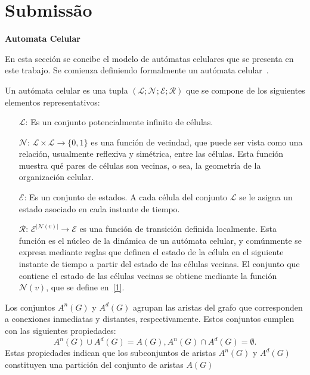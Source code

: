 \documentclass[a4paper,11pt]{article}
\begin{document}
{\section*{Submissão}

\textbf{Automata Celular}

En esta secci\'on se concibe el modelo de aut\'omatas celulares que se presenta en este trabajo. Se comienza definiendo formalmente un aut\'omata celular~\cite{5}.

Un aut\'omata celular es una tupla $(\mathcal{L}; \mathcal{N}; \mathcal{E}; \mathcal{R})$ que se compone de los siguientes elementos representativos:
\begin{itemize}
\item [$\mathcal{L}$:] Es un conjunto potencialmente infinito de c\'elulas.
\item [$\mathcal{N}$:] $\mathcal{L} \times \mathcal{L} \rightarrow \lbrace 0,1 \rbrace$ es una funci\'on de vecindad, que puede ser vista como una relaci\'on, usualmente reflexiva y sim\'etrica, entre las c\'elulas. Esta funci\'on muestra qu\'e pares de c\'elulas son vecinas, o sea, la geometr\'ia de la organizaci\'on celular.
\item [$\mathcal{E}$:] Es un conjunto de estados. A cada c\'elula del conjunto $\mathcal{L}$ se le asigna un estado asociado en cada instante de tiempo.
\item [$\mathcal{R}$:] $\mathcal{E}^{|\mathcal{N}(v)|} \rightarrow \mathcal{E}$ es una funci\'on de transici\'on definida localmente. Esta funci\'on es el n\'ucleo de la din\'amica de un aut\'omata celular, y com\'unmente se expresa mediante reglas que definen el estado de la c\'elula en el siguiente instante de tiempo a partir del estado de las c\'elulas vecinas. El conjunto que contiene el estado de las c\'elulas vecinas se obtiene mediante la funci\'on $\mathcal{N}(v)$, que se define en~\ref{1}.
\end{itemize}

Los conjuntos $A^n(G)$ y $A^d(G)$ agrupan las aristas del grafo que corresponden a conexiones inmediatas y distantes, respectivamente. Estos conjuntos cumplen con las siguientes propiedades:
\begin{subequations}
\begin{equation}
A^n(G) \cup A^d(G) = A(G),
\end{equation}
\begin{equation}
A^n(G) \cap A^d(G) = \emptyset.
\end{equation}
\end{subequations}
Estas propiedades indican que los subconjuntos de aristas $A^n(G)$ y $A^d(G)$ constituyen una partición del conjunto de aristas $A(G)$

}
\end{document}
